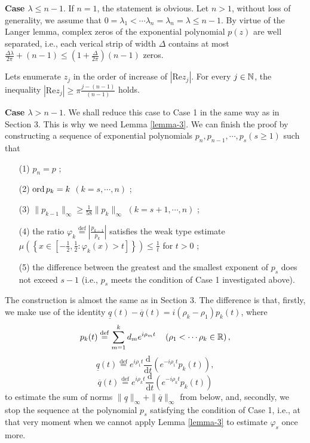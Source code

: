 \textbf{Case $\lambda \le  n-1$}. If $n=1$, the statement is obvious. Let $n>1$, without loss of generality, we assume that $0=\lambda_1<\cdots\lambda_n=\lambda_n=\lambda\le n-1$. By virtue of the Langer lemma, complex zeros of the exponential polynomial $p(z)$ are well separated, i.e., each verical strip of width $\Delta$ contains at most $ \frac{\Delta\lambda}{2\pi}+(n-1)\le \left( 1+ \frac{\Delta}{2\pi} \right) (n-1)$ zeros. 

Lets enumerate $z_j$ in the order of increase of $\left| \text{Re}z_j \right| $. For every $j \in \mathbb{N}$, the inequality $\left| \text{Re}z_j \right| \ge \pi \frac{j-(n-1)}{(n-1)}$ holds.

\textbf{Case $\lambda > n-1$}. We shall reduce this case to Case 1 in the same way as in Section 3. This is why we need Lemma \ref{lemma-3}. We can finish the proof by constructing a sequence of exponential polynomials $p_n,p_{n-1},\cdots,p_s(s\ge 1)$ such that 
\begin{itemize}
  \item [(1)] $p_n=p$ ;
  \item [(2)]  $\operatorname{ord} p_k=k$ $(k=s,\cdots,n)$ ;
  \item [(3)] $\|p_{k-1}\|_{\infty}\ge \frac{1}{58}\|p_k\|_{\infty}$ $(k=s+1,\cdots,n)$ ;
  \item [(4)] the ratio $\varphi_k \overset{\mathrm{def}}{=}\left| \frac{p_{k-1}}{p_k} \right| $ satisfies the weak type estimate $\mu\left( \left\{ x\in \left[ -\frac{1}{2},\frac{1}{2}:\varphi_k(x)>t \right]  \right\}  \right) \le \frac{1}{t}$ for $t>0$ ;
  \item [(5)] the difference between the greatest and the smallest exponent of $p_s$ does not exceed $s-1$ (i.e., $p_s$ meets the condition of Case 1 investigated above).
\end{itemize}
The construction is almost the same as in Section 3. The difference is that, firstly, we make use of the identity $\underline{q}(t)-\overline{q}(t)=i\left( \rho_k-\rho_1 \right) p_k(t)$, where 
    \[
      p_k(t)\overset{\mathrm{def}}{=}\sum_{m=1}^{k} d_m e^{i\rho_m t}\quad \left( \rho_1<\cdots\rho_k\in \mathbb{R} \right), 
    \] 
    \[
      \underline{q}(t)\overset{\mathrm{def}}{=}e^{i\rho_1t} \frac{\mathrm{d}}{\mathrm{d}t}\left( e^{-i\rho_1t}p_k(t) \right) ,
    \] 
    \[
      \overline{q}(t)\overset{\mathrm{def}}{=}e^{i\rho_kt} \frac{\mathrm{d}}{\mathrm{d}t}\left( e^{-i\rho_kt}p_k(t) \right) 
    \] 
    to estimate the sum of norms $\|\underline{q}\|_{\infty}+\|\overline{q}\|_{\infty}$ from below, and, secondly, we stop the sequence at the polynomial $p_s$ satisfying the condition of Case 1, i.e., at that very moment when we cannot apply Lemma \ref{lemma-3} to estimate $\varphi_s$ once more.

